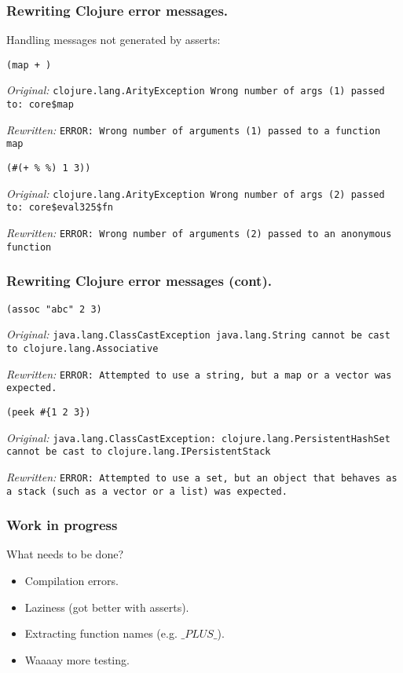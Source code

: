 \documentclass{beamer}
\begin{document}
\begin{frame}[fragile]
  \frametitle{Rewriting Clojure error messages.}
Handling messages not generated by asserts:

\vspace{.1in}

{\tt (map + )}

{\it Original:}
{\tt clojure.lang.ArityException Wrong number of args (1) passed to: core\$map}

{\it Rewritten:}
{\tt ERROR: Wrong number of arguments (1)  passed to a function map}

\vspace{.1in}

{\tt (\#(+ \% \%) 1 3))}

{\it Original:}
{\tt clojure.lang.ArityException Wrong number of args (2) passed to: core\$eval325\$fn}

{\it Rewritten:}
{\tt ERROR: Wrong number of arguments (2)  passed to an anonymous function}
 
\end{frame}

\begin{frame}[fragile]
  \frametitle{Rewriting Clojure error messages (cont).}

{\tt (assoc "abc" 2 3)}

{\it Original:}
{\tt  java.lang.ClassCastException java.lang.String cannot be cast to clojure.lang.Associative}

{\it Rewritten:}
{\tt ERROR: Attempted to use a string, but a map or a vector was expected.}

\vspace{.1in}

{\tt (peek \#\{1 2 3\})}

{\it Original:}
{\tt java.lang.ClassCastException: clojure.lang.PersistentHashSet cannot be cast to clojure.lang.IPersistentStack}

{\it Rewritten:}
{\tt ERROR: Attempted to use a set, but an object that behaves as a stack (such as a vector or a list) was expected.}
\end{frame}

\begin{frame}
  \frametitle{Work in progress}
What needs to be done? 
\begin{itemize}
\item Compilation errors.
\item Laziness (got better with asserts). 
\item Extracting function names (e.g. $\_PLUS\_$).
\item Waaaay more testing. 
\end{itemize}
\end{frame}
\end{document}
